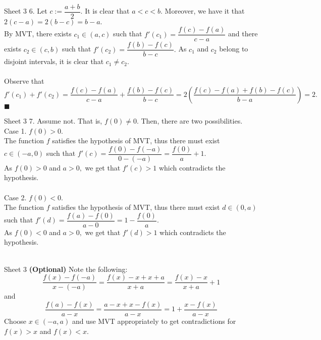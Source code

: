 \documentclass[handout, aspectratio=169]{beamer}
\begin{document}
\begin{frame}{Sheet 3}
	6. Let $c := \dfrac{a+b}{2}.$ It is clear that $a < c < b.$ Moreover, we have it that $2(c - a) = 2(b - c) = b-a.$\\
	By MVT, there exists $c_1 \in (a, c)$ such that $f'(c_1) = \dfrac{f(c) - f(a)}{c - a}$ and there exists $c_2 \in (c, b)$ such that $f'(c_2) = \dfrac{f(b) - f(c)}{b - c}.$ As $c_1$ and $c_2$ belong to disjoint intervals, it is clear that $c_1 \neq c_2.$\\~\\
	Observe that $f'(c_1) + f'(c_2) = \dfrac{f(c) - f(a)}{c - a} + \dfrac{f(b) - f(c)}{b - c} = 2\left(\dfrac{f(c) - f(a) + f(b) - f(c)}{b - a}\right) = 2.$ \hfill $\blacksquare$
\end{frame}
\begin{frame}{Sheet 3}
	7. Assume not. That is, $f(0) \neq 0.$ Then, there are two possibilities.\\
	Case 1. $f(0) > 0.$\\
	The function $f$ satisfies the hypothesis of MVT, thus there must exist $c \in (-a, 0)$ such that $f'(c) = \dfrac{f(0) - f(-a)}{0 - (-a)} = \dfrac{f(0)}{a} + 1.$\\
	As $f(0) > 0$ and $a > 0,$ we get that $f'(c) > 1$ which contradicts the hypothesis.\\~\\
	Case 2. $f(0) < 0.$\\
	The function $f$ satisfies the hypothesis of MVT, thus there must exist $d \in (0, a)$ such that $f'(d) = \dfrac{f(a) - f(0)}{a - 0} =1 - \dfrac{f(0)}{a}.$\\
	As $f(0) < 0$ and $a > 0,$ we get that $f'(d) > 1$ which contradicts the hypothesis.\\~\\
\end{frame}
\begin{frame}{Sheet 3}
	\textbf{(Optional)} Note the following:
	\[\dfrac{f(x) - f(-a)}{x - (-a)} = \dfrac{f(x) - x + x + a}{x + a} = \dfrac{f(x) - x}{x + a} + 1\]
	and
	\[\dfrac{f(a) - f(x)}{a - x} = \dfrac{a - x + x - f(x)}{a - x} = 1 + \dfrac{x - f(x)}{a - x}\]
	Choose $x \in (-a, a)$ and use MVT appropriately to get contradictions for $f(x) > x$ and $f(x) < x.$
\end{frame}
\end{document}
